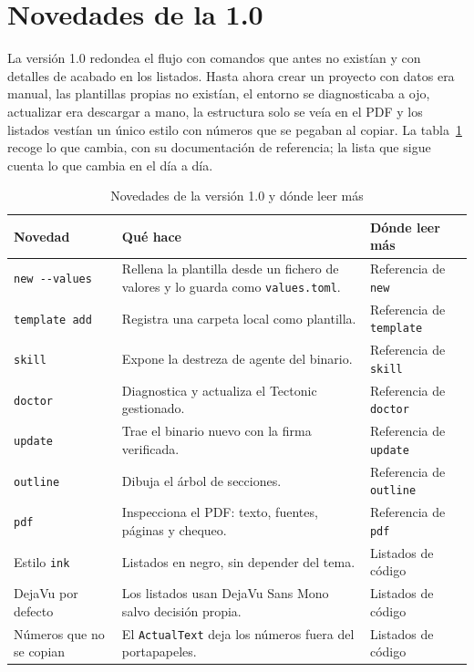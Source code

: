 \section{Novedades de la 1.0}\label{sec:novedades}

La versión 1.0 redondea el flujo con comandos que antes no existían y con
detalles de acabado en los listados. Hasta ahora crear un proyecto con
datos era manual, las plantillas propias no existían, el entorno se
diagnosticaba a ojo, actualizar era descargar a mano, la estructura solo
se veía en el PDF y los listados vestían un único estilo con números que
se pegaban al copiar. La tabla~\ref{tab:novedades} recoge lo que cambia,
con su documentación de referencia; la lista que sigue cuenta lo que
cambia en el día a día.

\begin{table}[H]
  \centering
  \caption{Novedades de la versión 1.0 y dónde leer más}
  \label{tab:novedades}
  \begin{tabularx}{\linewidth}{@{}l>{\raggedright\arraybackslash}X>{\raggedright\arraybackslash}X@{}}
    \toprule
    \sffamily\small\bfseries Novedad & \sffamily\small\bfseries Qué hace & \sffamily\small\bfseries Dónde leer más \\
    \midrule
    \texttt{new -{}-values} & Rellena la plantilla desde un fichero de valores y lo guarda como \texttt{values.toml}. & Referencia de \texttt{new} \\
    \texttt{template add} & Registra una carpeta local como plantilla. & Referencia de \texttt{template} \\
    \texttt{skill} & Expone la destreza de agente del binario. & Referencia de \texttt{skill} \\
    \texttt{doctor} & Diagnostica y actualiza el Tectonic gestionado. & Referencia de \texttt{doctor} \\
    \texttt{update} & Trae el binario nuevo con la firma verificada. & Referencia de \texttt{update} \\
    \texttt{outline} & Dibuja el árbol de secciones. & Referencia de \texttt{outline} \\
    \texttt{pdf} & Inspecciona el PDF: texto, fuentes, páginas y chequeo. & Referencia de \texttt{pdf} \\
    Estilo \texttt{ink} & Listados en negro, sin depender del tema. & Listados de código \\
    DejaVu por defecto & Los listados usan DejaVu Sans Mono salvo decisión propia. & Listados de código \\
    Números que no se copian & El \texttt{ActualText} deja los números fuera del portapapeles. & Listados de código \\
    \bottomrule
  \end{tabularx}
\end{table}

